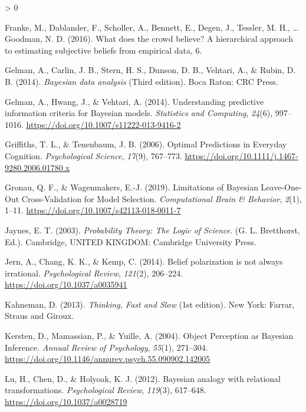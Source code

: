 \documentclass[
  english,
  man,floatsintext]{apa6}
\newlength{\cslhangindent}
\newenvironment{CSLReferences}[2] %
 {%
  \setlength{\parindent}{0pt}
  \ifodd #1 \everypar{\setlength{\hangindent}{\cslhangindent}}\ignorespaces\fi
  \ifnum #2 > 0
  \setlength{\parskip}{#2\baselineskip}
  \fi
 }%
 {}
\begin{document}
\begin{CSLReferences}{1}{0}
\leavevmode\hypertarget{ref-franke.etal2016}{}%
Franke, M., Dablander, F., Scholler, A., Bennett, E., Degen, J., Tessler, M. H., \ldots{} Goodman, N. D. (2016). What does the crowd believe? {A} hierarchical approach to estimating subjective beliefs from empirical data, 6.

\leavevmode\hypertarget{ref-gelman.etal2014a}{}%
Gelman, A., Carlin, J. B., Stern, H. S., Dunson, D. B., Vehtari, A., \& Rubin, D. B. (2014). \emph{Bayesian data analysis} (Third edition). {Boca Raton}: {CRC Press}.

\leavevmode\hypertarget{ref-gelman.etal2014}{}%
Gelman, A., Hwang, J., \& Vehtari, A. (2014). Understanding predictive information criteria for {Bayesian} models. \emph{Statistics and Computing}, \emph{24}(6), 997--1016. \url{https://doi.org/10.1007/s11222-013-9416-2}

\leavevmode\hypertarget{ref-griffiths.tenenbaum2006}{}%
Griffiths, T. L., \& Tenenbaum, J. B. (2006). Optimal {Predictions} in {Everyday Cognition}. \emph{Psychological Science}, \emph{17}(9), 767--773. \url{https://doi.org/10.1111/j.1467-9280.2006.01780.x}

\leavevmode\hypertarget{ref-gronau.wagenmakers2019}{}%
Gronau, Q. F., \& Wagenmakers, E.-J. (2019). Limitations of {Bayesian Leave}-{One}-{Out Cross}-{Validation} for {Model Selection}. \emph{Computational Brain \& Behavior}, \emph{2}(1), 1--11. \url{https://doi.org/10.1007/s42113-018-0011-7}

\leavevmode\hypertarget{ref-jaynes2003}{}%
Jaynes, E. T. (2003). \emph{Probability {Theory}: {The Logic} of {Science}}. (G. L. Bretthorst, Ed.). {Cambridge, UNITED KINGDOM}: {Cambridge University Press}.

\leavevmode\hypertarget{ref-jern.etal2014}{}%
Jern, A., Chang, K. K., \& Kemp, C. (2014). Belief polarization is not always irrational. \emph{Psychological Review}, \emph{121}(2), 206--224. \url{https://doi.org/10.1037/a0035941}

\leavevmode\hypertarget{ref-kahneman2013}{}%
Kahneman, D. (2013). \emph{Thinking, {Fast} and {Slow}} (1st edition). {New York}: {Farrar, Straus and Giroux}.

\leavevmode\hypertarget{ref-kersten.etal2004}{}%
Kersten, D., Mamassian, P., \& Yuille, A. (2004). Object {Perception} as {Bayesian Inference}. \emph{Annual Review of Psychology}, \emph{55}(1), 271--304. \url{https://doi.org/10.1146/annurev.psych.55.090902.142005}

\leavevmode\hypertarget{ref-lu.etal2012}{}%
Lu, H., Chen, D., \& Holyoak, K. J. (2012). Bayesian analogy with relational transformations. \emph{Psychological Review}, \emph{119}(3), 617--648. \url{https://doi.org/10.1037/a0028719}


\end{CSLReferences}
\end{document}
